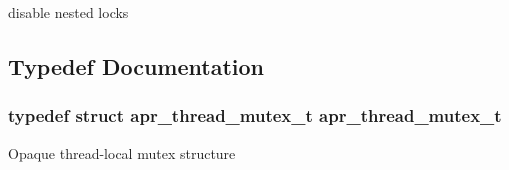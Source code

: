 disable nested locks 

\subsection{Typedef Documentation}
\hypertarget{group__apr__thread__mutex_ga95712060ba3a192036416e1ccef1db75}{
\subsubsection[{apr\-\_\-thread\-\_\-mutex\-\_\-t}]{\setlength{\rightskip}{0pt plus 5cm}typedef struct {\bf apr\-\_\-thread\-\_\-mutex\-\_\-t} {\bf apr\-\_\-thread\-\_\-mutex\-\_\-t}}}\label{group__apr__thread__mutex_ga95712060ba3a192036416e1ccef1db75}
Opaque thread-\/local mutex structure 

